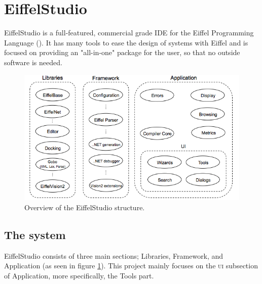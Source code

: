 \section{EiffelStudio}
EiffelStudio is a full-featured, commercial grade IDE for the Eiffel Programming Language (\cite[Quote from Origo website]{eiffel2006}). It has many tools to ease the design of systems with Eiffel and is focused on providing an "all-in-one" package for the user, so that no outside software is needed.

\begin{figure}[h]
\centerline{
\includegraphics[scale=0.7]{images/eiffelstudio-structure-full.png}
}
\caption[Overview of the EiffelStudio structure]{Overview of the EiffelStudio structure.}
\label{fig:eiffelstudio_structure}
\end{figure}


\subsection{The system}
EiffelStudio consists of three main sections; Libraries, Framework, and Application (as seen in figure \ref{fig:eiffelstudio_structure}). This project mainly focuses on the \textsc{ui} subsection of Application, more specifically, the Tools part.

